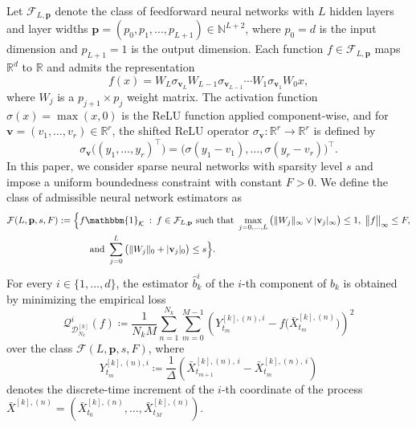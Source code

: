 \documentclass{article}
\theoremstyle{plain}
\theoremstyle{definition}
\theoremstyle{remark}
\newcommand{\rr}{\color{red}}
\newcommand{\black}{\color{black}}
\begin{document}
Let $\mathcal{F}_{L,\mathbf{p}}$ denote the class of feedforward neural networks with $L$ hidden layers and layer widths $\mathbf{p}=(p_0,p_1,\dots,p_{L+1})\in\mathbb{N}^{L+2}$, where $p_0=d$ is the input dimension and $p_{L+1}=1$ is the output dimension. Each function $f\in\mathcal{F}_{L,\mathbf{p}}$ maps $\mathbb{R}^d$ to $\mathbb{R}$ and admits the representation
\begin{equation}\label{eq:NN}
f(x)
=
W_L \sigma_{\mathbf v_L}
W_{L-1} \sigma_{\mathbf v_{L-1}}
\cdots
W_1 \sigma_{\mathbf v_1}
W_0 x,
\end{equation}
where $W_j$ is a $p_{j+1}\times p_j$ weight matrix. The activation function $\sigma(x)=\max(x,0)$ is the ReLU function applied component-wise, and for $\mathbf v=(v_1,\dots,v_r)\in\mathbb{R}^r$, the shifted ReLU operator $\sigma_{\mathbf v}:\mathbb{R}^r\to\mathbb{R}^r$ is defined by
\[
\sigma_{\mathbf v}\big((y_1,\dots,y_r)^\top\big)
=
\big(\sigma(y_1-v_1),\dots,\sigma(y_r-v_r)\big)^\top.
\]
In this paper, we consider sparse neural networks with sparsity level $s$ and impose a uniform boundedness constraint with constant $F>0$. We define the class of admissible neural network estimators as
\begin{align}%
&\mathcal{F}(L, \mathbf{p}, s, F) 
:= \Big\{ f\mathbbm{1}_{\mathcal{K}} \::\: f\in \mathcal{F}_{L, \mathbf{p}} \text{ such that }  \max_{j=0,\dots,L} \big( \|W_j\|_{\infty} \vee |\mathbf{v}_j|_{\infty} \big) \le 1,\; \big\| f \big\|_{\infty} \le F,\nonumber \\
&\hspace{3cm}   \text{ and } \sum_{j=0}^{L} \big( \|W_j\|_0 + |\mathbf{v}_j|_0 \big) \le s \Big\}.
\label{eq:sparseNN}
\end{align}
For every $i\in\{1, ..., d\}$, the estimator $\widehat b_k^i$ of the $i$-th component of $b_k$ is obtained by minimizing the empirical loss
\begin{equation}\label{eq:train-nn-loss}
\mathcal{Q}^i_{\mathcal D_{N_k}^{[k]}}(f)
\coloneqq\!
\frac{1}{N_kM}
\sum_{n=1}^{N_k}
\sum_{m=0}^{M-1}
\left(
Y^{[k],(n),i}_{t_m}
-
f\big(\bar X^{[k],(n)}_{t_m}\big)
\right)^2
\end{equation}
over the class $\mathcal{F}(L,\mathbf{p},s,F)$, where
\begin{equation}\label{eq:defY}
Y^{[k],(n),i}_{t_m}
\coloneqq
\frac{1}{\Delta}
\left(
\bar X^{[k],(n),\,i}_{t_{m+1}} - \bar X^{[k],(n),\,i}_{t_m}
\right)
\end{equation}
denotes the discrete-time increment of the $i$-th coordinate of the process
$\bar X^{[k],(n)} = (\bar X^{[k],(n)}_{t_0}, \dots, \bar X^{[k],(n)}_{t_M})$.
\end{document}
